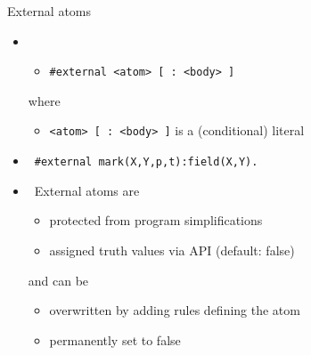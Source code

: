\begin{frame}{External atoms}
  \begin{itemize}
  \item {}
    \medskip
    \begin{itemize}
    \item [] \texttt{\#external <atom> [ : <body> ]}
    \end{itemize}
    \medskip
    where
    \smallskip
    \begin{itemize}
    \item \texttt{<atom> [ : <body> ]} \qquad is a (conditional) literal
    \end{itemize}
    \bigskip
  \item<2->  \ \texttt{\#external mark(X,Y,p,t)\;:\;field(X,Y).}
    \medskip
  \item <3->  \ External atoms are
    \begin{itemize}
    \item protected from program simplifications
    \item assigned truth values via API (default: false)
    \end{itemize}
    and can be
    \begin{itemize}
    \item overwritten by adding rules defining the atom
    \item permanently set to false
    \end{itemize}
  \end{itemize}
\end{frame}
%
